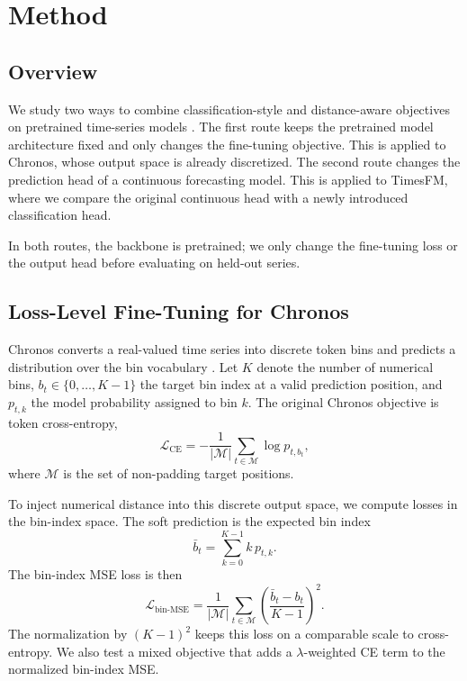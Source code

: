 \documentclass{article}
\begin{document}
\section{Method}

\subsection{Overview}

We study two ways to combine classification-style and distance-aware objectives
on pretrained time-series models \citep{ansari2024chronos,das2024timesfm}.  The
first route keeps the pretrained model architecture fixed and only changes the
fine-tuning objective.  This is applied to Chronos, whose output space is already
discretized.  The second route changes the prediction head of a continuous
forecasting model.  This is applied to TimesFM, where we compare the original
continuous head with a newly introduced classification head.

In both routes, the backbone is pretrained; we only change the fine-tuning loss
or the output head before evaluating on held-out series.

\subsection{Loss-Level Fine-Tuning for Chronos}

Chronos converts a real-valued time series into discrete token bins and predicts
a distribution over the bin vocabulary \citep{ansari2024chronos}.  Let $K$
denote the number of numerical bins, $b_t\in\{0,\ldots,K-1\}$ the target bin
index at a valid prediction position, and $p_{t,k}$ the model probability
assigned to bin $k$.  The original Chronos objective is token cross-entropy,
\begin{equation}
    \mathcal{L}_{\mathrm{CE}}
    = -\frac{1}{|\mathcal{M}|}\sum_{t\in\mathcal{M}}\log p_{t,b_t},
\end{equation}
where $\mathcal{M}$ is the set of non-padding target positions.

To inject numerical distance into this discrete output space, we compute losses
in the bin-index space.  The soft prediction is the expected bin index
\begin{equation}
    \bar{b}_t=\sum_{k=0}^{K-1} k\,p_{t,k}.
\end{equation}
The bin-index MSE loss is then
\begin{equation}
    \mathcal{L}_{\mathrm{bin\text{-}MSE}}
    = \frac{1}{|\mathcal{M}|}\sum_{t\in\mathcal{M}}
      \left(\frac{\bar{b}_t-b_t}{K-1}\right)^2 .
\end{equation}
The normalization by $(K-1)^2$ keeps this loss on a comparable scale to
cross-entropy.  We also test a mixed objective that adds a $\lambda$-weighted
CE term to the normalized bin-index MSE.
\end{document}
